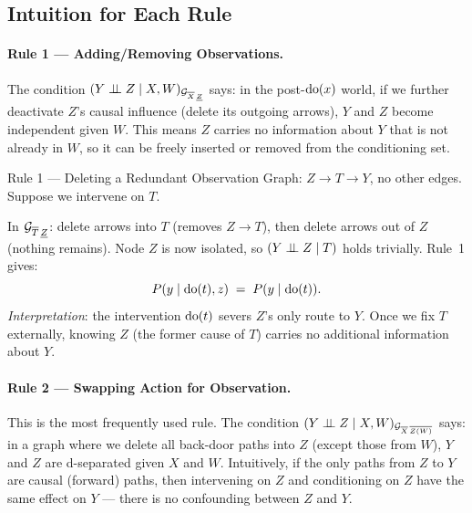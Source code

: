 \documentclass[master.tex]{subfiles}
\begin{document}
\subsection{Intuition for Each Rule}
\label{w3:sec:rules-intuition}
\paragraph{Rule 1 --- Adding/Removing Observations.}
The condition $(Y \perp\!\!\!\perp Z \mid X, W)_{\mathcal{G}_{\overline{X}\,\underline{Z}}}$
says: in the post-$\mathrm{do}(x)$ world, if we further deactivate $Z$'s causal
influence (delete its outgoing arrows), $Y$ and $Z$ become independent given
$W$.  This means $Z$ carries no information about $Y$ that is not already
in $W$, so it can be freely inserted or removed from the conditioning set.

\begin{example}{Rule 1 --- Deleting a Redundant Observation}
\label{w3:ex:rule1}
Graph: $Z \to T \to Y$, no other edges.  Suppose we intervene on $T$.

\begin{center}
\end{center}

\noindent
In $\mathcal{G}_{\overline{T}\,\underline{Z}}$: delete arrows into $T$ (removes
$Z \to T$), then delete arrows out of $Z$ (nothing remains).  Node $Z$ is
now isolated, so $(Y \perp\!\!\!\perp Z \mid T)$ holds trivially.  Rule~1 gives:
\[
  P(y \mid \mathrm{do}(t), z) \;=\; P(y \mid \mathrm{do}(t)).
\]
\textit{Interpretation}: the intervention $\mathrm{do}(t)$ severs $Z$'s only
route to $Y$.  Once we fix $T$ externally, knowing $Z$ (the former cause of
$T$) carries no additional information about $Y$.
\end{example}

\paragraph{Rule 2 --- Swapping Action for Observation.}
This is the most frequently used rule.  The condition
$(Y \perp\!\!\!\perp Z \mid X, W)_{\mathcal{G}_{\overline{X}\,\overline{Z(W)}}}$ says: in
a graph where we delete all back-door paths into $Z$ (except those from
$W$), $Y$ and $Z$ are d-separated given $X$ and $W$.  Intuitively, if
the only paths from $Z$ to $Y$ are causal (forward) paths, then intervening
on $Z$ and conditioning on $Z$ have the same effect on $Y$ --- there is no
confounding between $Z$ and $Y$.
\end{document}

